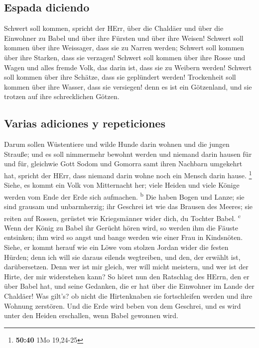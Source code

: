 \hypertarget{espada-diciendo}{%
\subsection{Espada diciendo}\label{espada-diciendo}}

 Schwert soll kommen, spricht der HErr, über die Chaldäer
und über die Einwohner zu Babel und über ihre Fürsten und über ihre
Weisen!  Schwert soll kommen über ihre Weissager, dass
sie zu Narren werden; Schwert soll kommen über ihre Starken, dass sie
verzagen!  Schwert soll kommen über ihre Rosse und Wagen
und alles fremde Volk, das darin ist, dass sie zu Weibern werden!
Schwert soll kommen über ihre Schätze, dass sie geplündert werden!
 Trockenheit soll kommen über ihre Wasser, dass sie
versiegen! denn es ist ein Götzenland, und sie trotzen auf ihre
schrecklichen Götzen.

\hypertarget{varias-adiciones-y-repeticiones}{%
\subsection{Varias adiciones y
repeticiones}\label{varias-adiciones-y-repeticiones}}

 Darum sollen Wüstentiere und wilde Hunde darin wohnen
und die jungen Strauße; und es soll nimmermehr bewohnt werden und
niemand darin hausen für und für,  gleichwie Gott Sodom
und Gomorra samt ihren Nachbarn umgekehrt hat, spricht der HErr, dass
niemand darin wohne noch ein Mensch darin hause. \footnote{\textbf{50:40}
  1Mo 19,24-25}  Siehe, es kommt ein Volk von Mitternacht
her; viele Heiden und viele Könige werden vom Ende der Erde sich
aufmachen. \textsuperscript{b}  Die haben Bogen und
Lanze; sie sind grausam und unbarmherzig; ihr Geschrei ist wie das
Brausen des Meeres; sie reiten auf Rossen, gerüstet wie Kriegsmänner
wider dich, du Tochter Babel. \textsuperscript{c}  Wenn
der König zu Babel ihr Gerücht hören wird, so werden ihm die Fäuste
entsinken; ihm wird so angst und bange werden wie einer Frau in
Kindsnöten.  Siehe, er kommt herauf wie ein Löwe vom
stolzen Jordan wider die festen Hürden; denn ich will sie daraus eilends
wegtreiben, und den, der erwählt ist, darübersetzen. Denn wer ist mir
gleich, wer will micht meistern, und wer ist der Hirte, der mir
widerstehen kann?  So höret nun den Ratschlag des HErrn,
den er über Babel hat, und seine Gedanken, die er hat über die Einwohner
im Lande der Chaldäer! Was gilt's? ob nicht die Hirtenknaben sie
fortschleifen werden und ihre Wohnung zerstören.  Und die
Erde wird beben von dem Geschrei, und es wird unter den Heiden
erschallen, wenn Babel gewonnen wird.

